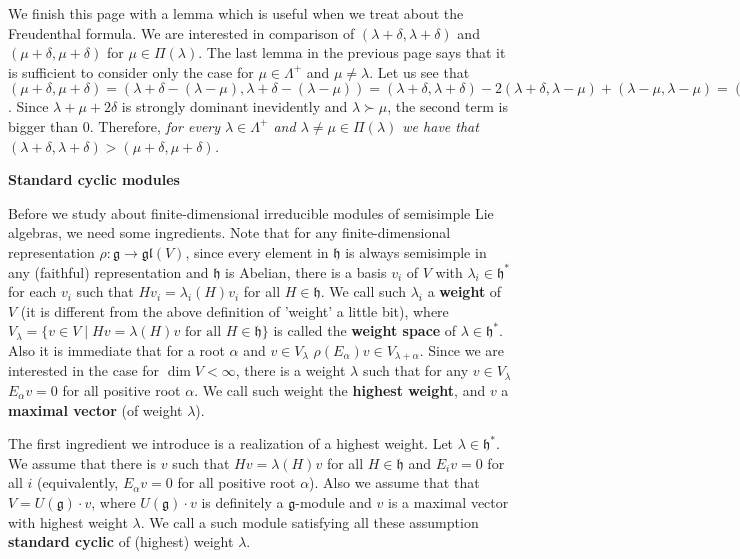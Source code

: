 \documentclass{article}
\newcommand{\SBar}{\;|\;}
\newcommand{\lie}[1]{\mathfrak{#1}}
\begin{document}
We finish this page with a lemma which is useful when we treat about the Freudenthal formula.
We are interested in comparison of $(\lambda + \delta, \lambda + \delta)$ and $(\mu + \delta, \mu + \delta)$ for $\mu \in \Pi(\lambda)$.
The last lemma in the previous page says that it is sufficient to consider only the case for $\mu \in \Lambda^+$ and $\mu \ne \lambda$.
Let us see that $(\mu + \delta, \mu + \delta) = (\lambda + \delta - (\lambda - \mu), \lambda + \delta - (\lambda - \mu)) = (\lambda + \delta, \lambda + \delta) - 2(\lambda + \delta, \lambda - \mu) + (\lambda - \mu, \lambda - \mu) = (\lambda + \delta, \lambda + \delta) - (\lambda + \mu + 2\delta, \lambda - \mu)$.
Since $\lambda + \mu + 2\delta$ is strongly dominant inevidently and $\lambda \succ \mu$, the second term is bigger than 0.
Therefore, \textit{for every $\lambda \in \Lambda^+$ and $\lambda \ne \mu \in \Pi(\lambda)$ we have that $(\lambda + \delta, \lambda + \delta) > (\mu + \delta, \mu + \delta)$.}

\newpage

\textbf{Standard cyclic modules}

Before we study about finite-dimensional irreducible modules of semisimple Lie algebras, we need some ingredients.
Note that for any finite-dimensional representation $\rho : \lie{g} \to \lie{gl}(V)$, since every element in $\lie{h}$ is always semisimple in any (faithful) representation and $\lie{h}$ is Abelian, there is a basis $v_i$ of $V$ with $\lambda_i \in \lie{h}^*$ for each $v_i$ such that $Hv_i = \lambda_i(H) v_i$ for all $H \in \lie{h}$.
We call such $\lambda_i$ a \textbf{weight} of $V$ (it is different from the above definition of 'weight' a little bit), where $V_\lambda = \{v \in V \SBar Hv = \lambda(H) v \textrm{ for all $H \in \lie{h}$}\}$ is called the \textbf{weight space} of $\lambda \in \lie{h}^*$.
Also it is immediate that for a root $\alpha$ and $v \in V_\lambda$ $\rho(E_\alpha) v \in V_{\lambda + \alpha}$.
Since we are interested in the case for $\dim{V} < \infty$, there is a weight $\lambda$ such that for any $v \in V_\lambda$ $E_\alpha v = 0$ for all positive root $\alpha$.
We call such weight the \textbf{highest weight}, and $v$ a \textbf{maximal vector} (of weight $\lambda$).

The first ingredient we introduce is a realization of a highest weight.
Let $\lambda \in \lie{h}^*$.
We assume that there is $v$ such that $Hv = \lambda(H) v$ for all $H \in \lie{h}$ and $E_i v = 0$ for all $i$ (equivalently, $E_\alpha v = 0$ for all positive root $\alpha$).
Also we assume that that $V = U(\lie{g}) \cdot v$, where $U(\lie{g}) \cdot v$ is definitely a $\lie{g}$-module and $v$ is a maximal vector with highest weight $\lambda$.
We call a such module satisfying all these assumption \textbf{standard cyclic} of (highest) weight $\lambda$.
\end{document}
